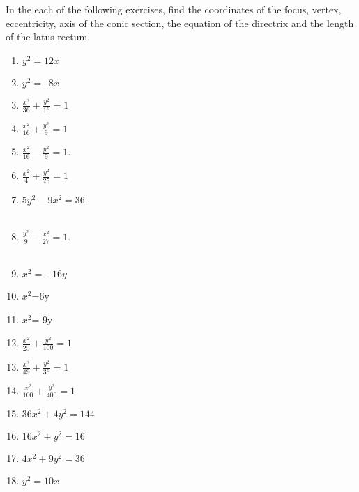 In the each of the following exercises, find the coordinates of the focus, vertex, eccentricity, axis of the conic section, the equation of the directrix and the length of the latus rectum.
\begin{enumerate}[label=\thesubsection.\arabic*,ref=\thesubsection.\theenumi]
\item $y^2=12x$ 
\label{chapters/11/11/2/1}
\\
\solution

\item 
$y^2 = –8x$
\\
\solution

  \item $\frac{x^2}{36}+\frac{y^2}{16}=1$
\\
\solution

  \item $\frac{x^2}{16}+\frac{y^2}{9}=1$
\\
\solution

	\item $\frac{x^2}{16}-\frac{y^2}{9} = 1$. \\ 
		\solution
		
\begin{table}[H]
\centering
\caption{}
\label{tab:std-conic-params-sol}
\resizebox{\columnwidth}{!}{%
		
		}
\end{table}
  \item $\frac{x^2}{4}+\frac{y^2}{25}=1$
\\
\solution

	\item $5{y^2}-9{x^2}=36$.
		\\
		\solution
		\\
		
	\item $\frac{y^2}{9}-\frac{x^2}{27}=1$.
		\\
		\solution
		\\
		
\item $x^2=-16y$
\\
\solution

\item $x^2$=6y 
\\
\solution

\begin{table}[H]
\centering
\caption{}
\label{tab:rot-conic-params-sol}
\resizebox{\columnwidth}{!}{%
		
		}
\end{table}
\item $x^2$=-9y  
  \item $\frac{x^2}{25}+\frac{y^2}{100}=1$
  \item $\frac{x^2}{49}+\frac{y^2}{36}=1$
  \item $\frac{x^2}{100}+\frac{y^2}{400}=1$
  \item $36x^2+4y^2=144$
  \item $16x^2+y^2=16$
  \item $4x^2+9y^2=36$
\item $y^2=10x$  
\end{enumerate}

